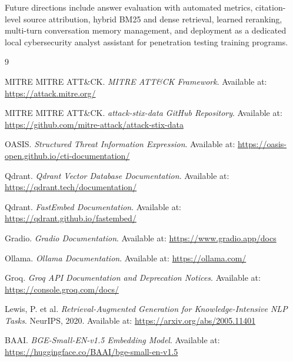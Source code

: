 \documentclass[12pt,a4paper]{report}
\newcommand{\ATTACK}{MITRE ATT\&CK}
\begin{document}
Future directions include answer evaluation with automated metrics, citation-level source attribution, hybrid BM25 and dense retrieval, learned reranking, multi-turn conversation memory management, and deployment as a dedicated local cybersecurity analyst assistant for penetration testing training programs.


\begin{thebibliography}{9}

MITRE \ATTACK{}.
\textit{\ATTACK{} Framework}.
Available at: \url{https://attack.mitre.org/}

MITRE \ATTACK{}.
\textit{attack-stix-data GitHub Repository}.
Available at: \url{https://github.com/mitre-attack/attack-stix-data}

OASIS.
\textit{Structured Threat Information Expression}.
Available at: \url{https://oasis-open.github.io/cti-documentation/}

Qdrant.
\textit{Qdrant Vector Database Documentation}.
Available at: \url{https://qdrant.tech/documentation/}

Qdrant.
\textit{FastEmbed Documentation}.
Available at: \url{https://qdrant.github.io/fastembed/}

Gradio.
\textit{Gradio Documentation}.
Available at: \url{https://www.gradio.app/docs}

Ollama.
\textit{Ollama Documentation}.
Available at: \url{https://ollama.com/}

Groq.
\textit{Groq API Documentation and Deprecation Notices}.
Available at: \url{https://console.groq.com/docs/}

Lewis, P. et al.
\textit{Retrieval-Augmented Generation for Knowledge-Intensive NLP Tasks}.
NeurIPS, 2020.
Available at: \url{https://arxiv.org/abs/2005.11401}

BAAI.
\textit{BGE-Small-EN-v1.5 Embedding Model}.
Available at: \url{https://huggingface.co/BAAI/bge-small-en-v1.5}

\end{thebibliography}
\end{document}
